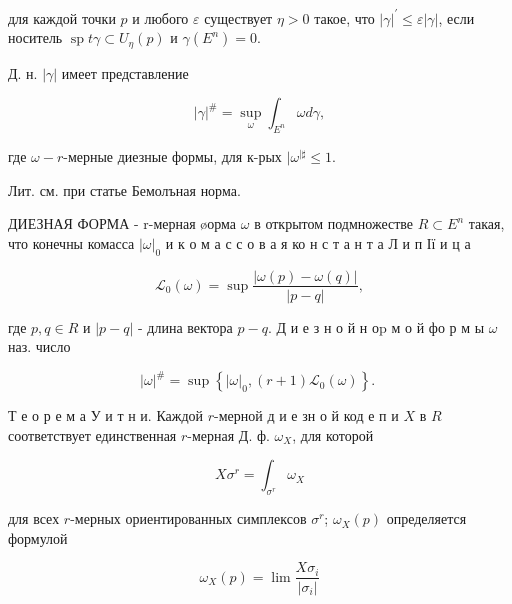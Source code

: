 \documentclass[10pt]{article}
\begin{document}
для каждой точки $p$ и любого $\varepsilon$ существует $\eta>0$ такое, что $|\gamma|^{\prime} \leqslant \varepsilon|\gamma|$, если носитель $\operatorname{sp} t \gamma \subset U_{\eta}(p)$ и $\gamma\left(E^{n}\right)=0$.



Д. н. $|\gamma|$ имеет представление



\[

|\gamma|^{\#}=\sup _{\omega} \int_{E^{n}} \omega d \gamma,

\]



где $\omega-r$-мерные диезные формы, для к-рых $\mid \omega^{\mid \sharp} \leqslant 1$.



Лит. см. при статье Бемолъная норма.



ДИЕЗНАЯ ФОРМА - r-мерная øорма $\omega$ в открытом подмножестве $R \subset E^{n}$ такая, что конечны комасса $|\omega|_{0}$ и к о м а с с о в а я ко н с т а н т а Л и п Ії и ц а



\[

\mathscr{L}_{0}(\omega)=\sup \frac{|\omega(p)-\omega(q)|}{|p-q|},

\]



где $p, q \in R$ и $|p-q|$ - длина вектора $p-q$. Д и е з н о й н $о \mathrm{p}$ м о й фо р м ы $\omega$ наз. число



\[

|\omega|^{\#}=\sup \left\{|\omega|_{0},(r+1) \mathscr{L}_{0}(\omega)\right\} \text {. }

\]



Т е о р е м а У и т н и. Каждой $r$-мерной д и е зн о й код е п и $X$ в $R$ соответствует единственная $r$-мерная Д. ф. $\omega_{X}$, для которой



\[

X \sigma^{r}=\int_{\sigma^{r}} \omega_{X}

\]



для всех $r$-мерных ориентированных симплексов $\sigma^{r}$; $\omega_{X}(p)$ определяется формулой



\[

\omega_{X}(p)=\lim \frac{X \sigma_{i}}{\left|\sigma_{i}\right|}

\]
\end{document}
